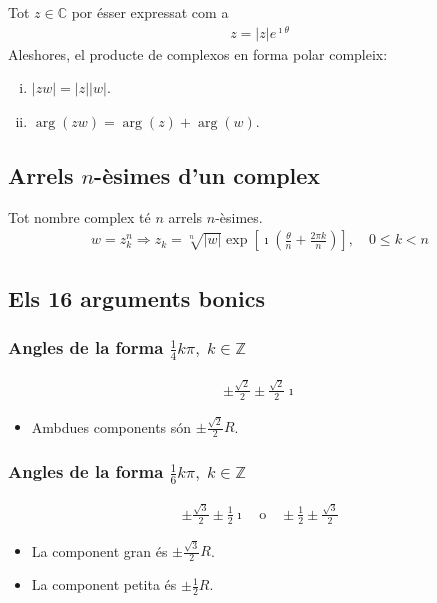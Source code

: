 Tot $z \in \mathbb{C}$ por ésser expressat com a
\begin{align}
    z = |z| e^{\imath \theta}
\end{align}
Aleshores, el producte de complexos en forma polar compleix:
\begin{enumerate}[i)]
    \item $|zw| = |z| |w|$.
    \item $\operatorname{arg}(zw) = \operatorname{arg}(z) + \operatorname{arg} (w)$.
\end{enumerate}

\subsection{Arrels $n$-èsimes d'un complex}
Tot nombre complex té $n$ arrels $n$-èsimes.
\begin{align}
    w = z_{k}^{n} \Rightarrow z_{k} = \sqrt[n]{|w|} \exp \left[\imath \left(\frac{\theta}{n} + \frac{2 \pi k}{n} \right) \right], \quad 0 \leq k < n
\end{align}

\subsection{Els 16 arguments bonics}
\subsubsection*{Angles de la forma $\frac{1}{4}k \pi , \; k \in \mathbb{Z}$ }
\begin{align}
    \pm \frac{\sqrt{2}}{2} \pm \frac{\sqrt{2}}{2} \imath
\end{align}
\begin{itemize}
    \item Ambdues components són $\pm \frac{\sqrt{2}}{2} R$.
\end{itemize}

\subsubsection*{Angles de la forma $\frac{1}{6}k \pi , \; k \in \mathbb{Z}$ }
\begin{align}
    \pm \frac{\sqrt{3}}{2} \pm \frac{1}{2} \imath \quad \text{o} \quad \pm \frac{1}{2} \pm \frac{\sqrt{3}}{2}
\end{align}
\begin{itemize}
    \item La component gran és $\pm \frac{\sqrt{3}}{2} R$.
    \item La component petita és $\pm \frac{1}{2} R$.
\end{itemize}

